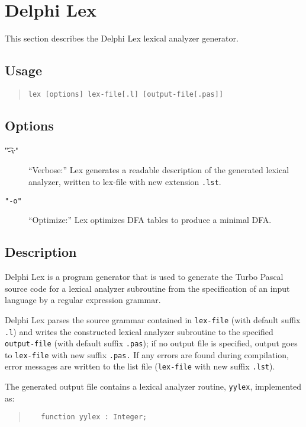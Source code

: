 \documentclass{article}
\begin{document}
\newpage

\section{Delphi Lex}

This section describes the Delphi Lex lexical analyzer generator.

\subsection{Usage}

\begin{quote}\begin{verbatim}
lex [options] lex-file[.l] [output-file[.pas]]
\end{verbatim}\end{quote}

\subsection{Options}

\begin{description}
   \item[\t"-v"]
      ``Verbose:'' Lex generates a readable description of the generated
      lexical analyzer, written to lex-file with new extension \verb".lst".
   \item[\tt"-o"]
      ``Optimize:'' Lex optimizes DFA tables to produce a minimal DFA.
\end{description}

\subsection{Description}

Delphi Lex is a program generator that is used to generate the Turbo Pascal
source code for a lexical analyzer subroutine from the specification
of an input language by a regular expression grammar.

Delphi Lex parses the source grammar contained in \verb"lex-file" (with default
suffix \verb".l") and writes the constructed lexical analyzer subroutine
to the specified \verb"output-file" (with default suffix \verb".pas"); if no
output file is specified, output goes to \verb"lex-file" with new suffix
\verb".pas." If any errors are found during compilation, error messages are
written to the list file (\verb"lex-file" with new suffix \verb".lst").

The generated output file contains a lexical analyzer routine, \verb"yylex",
implemented as:
\begin{quote}\begin{verbatim}
   function yylex : Integer;
\end{verbatim}\end{quote}
\end{document}
